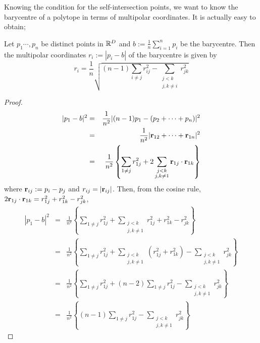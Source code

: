 \documentclass{article}
\begin{document}
Knowing the condition for the self-intersection points, we want to know the barycentre of a polytope in terms of multipolar coordinates. It is actually easy to obtain;
\begin{prop}
Let $p_1 \cdots, p_n$ be distinct points in $\mathbb R^{D}$ and $b:= \frac{1}{n}\sum_{i=1}^{n}p_i$ be the barycentre. Then the multipolar coordinates $r_i := |p_i-b|$ of the barycentre is given by
\begin{equation}
\label{eq:barycentre}
r_i =  \frac{1}{n}\sqrt{ (n-1)\sum_{i\ne j } r_{ij}^2 - \sum_{\substack{j < k \\ j,k \ne i}}r_{jk}^2}
\end{equation}
\end{prop}
\begin{proof}
\begin{eqnarray}
|p_1-b|^2 & = & \frac{1}{n^2}|(n-1)p_1-(p_2 + \cdots + p_n)|^2 \nonumber\\
 & = & \frac{1}{n^2}|\textbf r _{12} + \cdots + \textbf r_{1n}|^2 \nonumber\\
 &=& \frac{1}{n^2}\left\{\sum_{1\ne j} r_{1j}^2 + 2\sum_{\substack{j < k \\ j,k \ne 1}}\textbf r_{1j}\cdot \textbf r_{1k}\right\}
\end{eqnarray}
where $\textbf r_{ij} : = p_i - p_j$ and $r_{ij} = |\textbf r_{ij}|$. Then, from the cosine rule, $2\textbf r_{1j}\cdot \textbf r_{1k} = r_{1j}^2 + r_{1k}^2 - r_{jk}^2$,
\begin{eqnarray}
|p_1-b|^2 &=& \frac{1}{n^2}\left\{\sum_{1\ne j} r_{1j}^2 + \sum_{\substack{j < k \\ j,k \ne 1}}r_{1j}^2 + r_{1k}^2 - r_{jk}^2\right\} \nonumber\\
&=& \frac{1}{n^2}\left\{\sum_{1\ne j} r_{1j}^2 + \sum_{\substack{j < k \\ j,k \ne 1}}(r_{1j}^2 + r_{1k}^2 )-  \sum_{\substack{j < k \\ j,k \ne 1}} r_{jk}^2\right\} \nonumber\\
&=& \frac{1}{n^2}\left\{\sum_{1\ne j} r_{1j}^2 +(n-2) \sum_{1\ne j}r_{1j}^2 -  \sum_{\substack{j < k \\ j,k \ne 1}} r_{jk}^2\right\} \nonumber\\
&=& \frac{1}{n^2}\left\{(n-1) \sum_{1\ne j}r_{1j}^2 -  \sum_{\substack{j < k \\ j,k \ne 1}} r_{jk}^2\right\} \nonumber
\end{eqnarray}
\end{proof}
\end{document}
